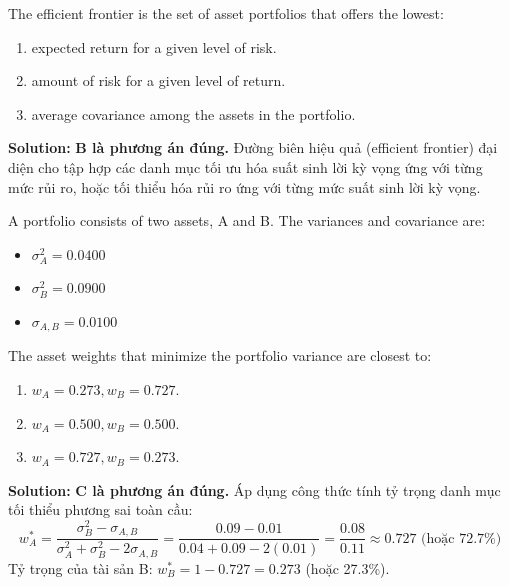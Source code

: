 \begin{tcolorbox}[
	colback=gray!5!white,
	colframe=black!15!white,
	boxrule=0.5pt,
	arc=3pt,
	title=\textbf{Question 1},
	coltitle=black,
	colbacktitle=black!5!white,
	before skip=6pt,
	after skip=6pt,
	breakable
]
The efficient frontier is the set of asset portfolios that offers the lowest:
\begin{enumerate}[label=\Alph*.]
	\item expected return for a given level of risk.
	\item amount of risk for a given level of return.
	\item average covariance among the assets in the portfolio.
\end{enumerate}

\textbf{Solution:}
\textbf{B là phương án đúng.} Đường biên hiệu quả (efficient frontier) đại diện cho tập hợp các danh mục tối ưu hóa suất sinh lời kỳ vọng ứng với từng mức rủi ro, hoặc tối thiểu hóa rủi ro ứng với từng mức suất sinh lời kỳ vọng.
\end{tcolorbox}

\begin{tcolorbox}[
	colback=gray!5!white,
	colframe=black!15!white,
	boxrule=0.5pt,
	arc=3pt,
	title=\textbf{Question 2},
	coltitle=black,
	colbacktitle=black!5!white,
	before skip=6pt,
	after skip=6pt,
	breakable
]
A portfolio consists of two assets, A and B. The variances and covariance are:
\begin{itemize}
	\item $\sigma_A^2 = 0.0400$
	\item $\sigma_B^2 = 0.0900$
	\item $\sigma_{A,B} = 0.0100$
\end{itemize}
The asset weights that minimize the portfolio variance are closest to:
\begin{enumerate}[label=\Alph*.]
	\item $w_A = 0.273, w_B = 0.727$.
	\item $w_A = 0.500, w_B = 0.500$.
	\item $w_A = 0.727, w_B = 0.273$.
\end{enumerate}

\textbf{Solution:}
\textbf{C là phương án đúng.} Áp dụng công thức tính tỷ trọng danh mục tối thiểu phương sai toàn cầu:
\[
w_A^* = \frac{\sigma_B^2 - \sigma_{A,B}}{\sigma_A^2 + \sigma_B^2 - 2\sigma_{A,B}} = \frac{0.09 - 0.01}{0.04 + 0.09 - 2(0.01)} = \frac{0.08}{0.11} \approx 0.727 \text{ (hoặc 72.7\%)}
\]
Tỷ trọng của tài sản B: $w_B^* = 1 - 0.727 = 0.273$ (hoặc 27.3\%).
\end{tcolorbox}


